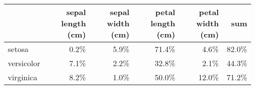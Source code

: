 \begin{tabular}{lrrrrr}
\toprule
{} &  sepal length (cm) &  sepal width (cm) &  petal length (cm) &  petal width (cm) &   sum \\
\midrule
setosa     &               0.2\% &              5.9\% &              71.4\% &              4.6\% & 82.0\% \\
versicolor &               7.1\% &              2.2\% &              32.8\% &              2.1\% & 44.3\% \\
virginica  &               8.2\% &              1.0\% &              50.0\% &             12.0\% & 71.2\% \\
\bottomrule
\end{tabular}
